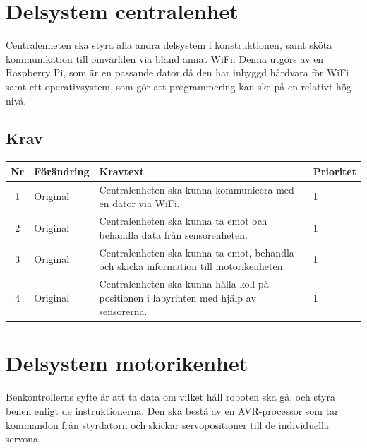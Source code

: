 \documentclass[a4paper,titlepage,12pt]{article}
\begin{document}
	\section{Delsystem centralenhet}
	Centralenheten ska styra alla andra delsystem i konstruktionen, samt sköta
	kommunikation till omvärlden via bland annat WiFi. Denna utgörs av en Raspberry
	Pi, som är en passande dator då den har inbyggd hårdvara för WiFi samt
	ett operativsystem, som gör att programmering kan ske på en relativt hög nivå.

	\subsection{Krav}
	\begin{table}[h!]
		\label{tab:label}
		\begin{tabularx}{\textwidth}{|c|l|X|l|}
			\hline
			\textbf{Nr} & \textbf{Förändring} & \textbf{Kravtext} & \textbf{Prioritet} 
				\\ \hline

			1 & Original & Centralenheten ska kunna kommunicera med en dator via WiFi. & 1
				\\ \hline

			2 & Original & Centralenheten ska kunna ta emot och behandla data från sensorenheten.& 1
				\\ \hline

			3 & Original & Centralenheten ska kunna ta emot, behandla och skicka information 
				till motorikenheten. & 1
				\\ \hline

			4 & Original & Centralenheten ska kunna hålla koll på positionen i labyrinten 
				med hjälp av sensorerna. & 1
				\\ \hline
		\end{tabularx}
	\end{table}




	\section{Delsystem motorikenhet}
	Benkontrollerns syfte är att ta data om vilket håll roboten ska gå, och styra benen enligt de
	instruktionerna. Den ska bestå av en AVR-processor som tar kommandon från styrdatorn och skickar
	servopositioner till de individuella servona.
\end{document}
